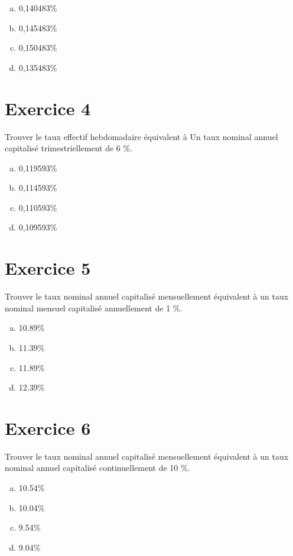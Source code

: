 \documentclass[10pt,a4paper]{article}
\begin{document}
\begin{enumerate}[a)]
\item 0,140483\%
\item 0,145483\%
\item 0,150483\%
\item 0,135483\%
\end{enumerate}

\section*{Exercice 4}
Trouver le taux effectif hebdomadaire équivalent à Un taux nominal annuel capitalisé trimestriellement de 6 \%.


\begin{enumerate}[a)]
\item 0,119593\%
\item 0,114593\%
\item 0,110593\%
\item 0,109593\%
\end{enumerate}


\section*{Exercice 5}
Trouver le taux nominal annuel capitalisé mensuellement équivalent à un taux nominal mensuel capitalisé annuellement de 1 \%.



\begin{enumerate}[a)]
\item 10.89\%
\item 11.39\%
\item 11.89\%
\item 12.39\%
\end{enumerate}


\section*{Exercice 6}
Trouver le taux nominal annuel capitalisé mensuellement équivalent à un taux nominal annuel capitalisé continuellement de 10 \%.



\begin{enumerate}[a)]
\item 10.54\%
\item 10.04\%
\item 9.54\%
\item 9.04\%
\end{enumerate}
\end{document}
